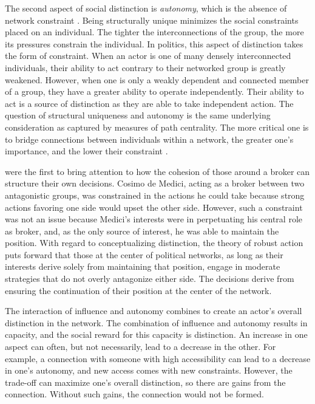 \documentclass[12pt]{article}
\begin{document}
The second aspect of social distinction is \textit{autonomy}, which is the absence of network constraint \citep{burt1980autonomy}. Being structurally unique minimizes the social constraints placed on an individual. The tighter the interconnections of the group, the more its pressures constrain the individual. In politics, this aspect of distinction takes the form of constraint. When an actor is one of many densely interconnected individuals, their ability to act contrary to their networked group is greatly weakened. However, when one is only a weakly dependent and connected member of a group, they have a greater ability to operate independently. Their ability to act is a source of distinction as they are able to take independent action. The question of structural uniqueness and autonomy is the same underlying consideration as captured by measures of path centrality. The more critical one is to bridge connections between individuals within a network, the greater one's importance, and the lower their constraint \citep{burt1995structural-5e8}. 

\citet[1263-4]{padgett1993robust} were the first to bring attention to how the cohesion of those around a broker can structure their own decisions. Cosimo de Medici, acting as a broker between two antagonistic groups, was constrained in the actions he could take because strong actions favoring one side would upset the other side. However, such a constraint was not an issue because Medici’s interests were in perpetuating his central role as broker, and, as the only source of interest, he was able to maintain the position. With regard to conceptualizing distinction, the theory of robust action puts forward that those at the center of political networks, as long as their interests derive solely from maintaining that position, engage in moderate strategies that do not overly antagonize either side. The decisions derive from ensuring the continuation of their position at the center of the network. 

The interaction of influence and autonomy combines to create an actor’s overall distinction in the network. The combination of influence and autonomy results in capacity, and the social reward for this capacity is distinction. An increase in one aspect can often, but not necessarily, lead to a decrease in the other. For example, a connection with someone with high accessibility can lead to a decrease in one’s autonomy, and new access comes with new constraints. However, the trade-off can maximize one’s overall distinction, so there are gains from the connection. Without such gains, the connection would not be formed.
\end{document}
